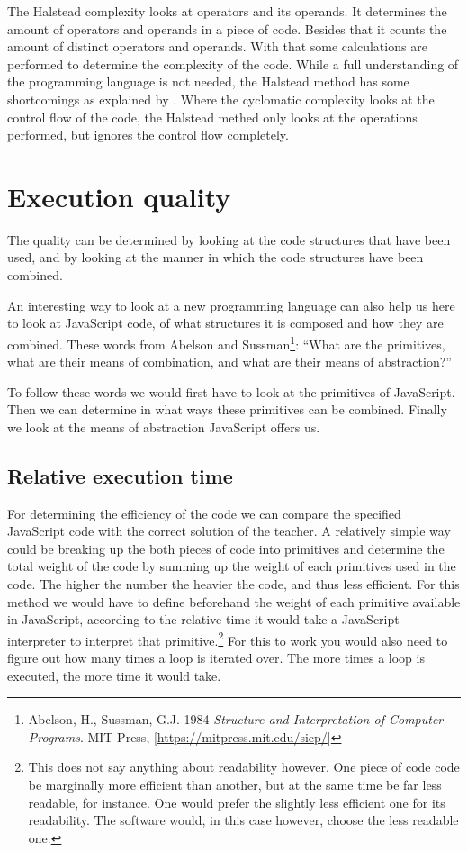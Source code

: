 \documentclass{article}
\begin{document}
The Halstead complexity looks at operators and its operands. It determines the
amount of operators and operands in a piece of code. Besides that it counts the
amount of distinct operators and operands. With that some calculations are
performed to determine the complexity of the code. While a full understanding
of the programming language is not needed, the Halstead method has some
shortcomings as explained by \citet{yu2010survey}. Where the cyclomatic
complexity looks at the control flow of the code, the Halstead methed only
looks at the operations performed, but ignores the control flow completely.

\section{Execution quality}

The quality can be determined by looking at the code structures that have been
used, and by looking at the manner in which the code structures have been
combined.

An interesting way to look at a new programming language can also help us here
to look at JavaScript code, of what structures it is composed and how they are
combined. These words from Abelson and Sussman\footnote{Abelson, H., Sussman,
G.J. 1984 {\em Structure and Interpretation of Computer Programs}. MIT Press,
[\url{https://mitpress.mit.edu/sicp/}]}: ``What are the primitives, what are
their means of combination, and what are their means of abstraction?''

To follow these words we would first have to look at the primitives of
JavaScript. Then we can determine in what ways these primitives can be
combined. Finally we look at the means of abstraction JavaScript offers us.

\subsection{Relative execution time}

For determining the efficiency of the code we can compare the specified
JavaScript code with the correct solution of the teacher. A relatively simple
way could be breaking up the both pieces of code into primitives and determine
the total weight of the code by summing up the weight of each primitives used
in the code. The higher the number the heavier the code, and thus less
efficient. For this method we would have to define beforehand the weight of
each primitive available in JavaScript, according to the relative time it would
take a JavaScript interpreter to interpret that primitive.\footnote{This does
not say anything about readability however. One piece of code code be
marginally more efficient than another, but at the same time be far less
readable, for instance. One would prefer the slightly less efficient one for
its readability. The software would, in this case however, choose the less
readable one.} For this to work you would also need to figure out how many
times a loop is iterated over. The more times a loop is executed, the more time
it would take.
\end{document}
